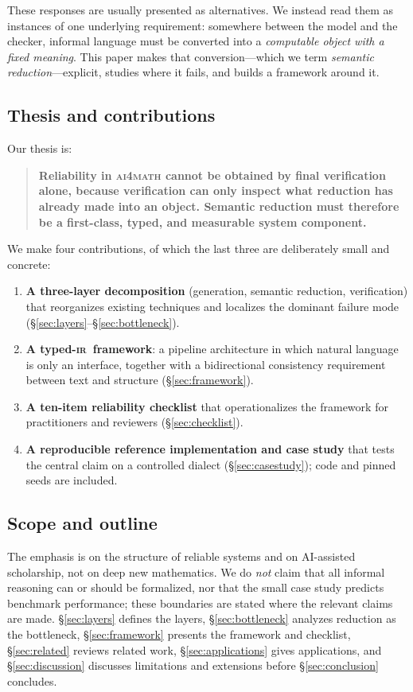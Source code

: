\documentclass[11pt,a4paper]{article}
\newcommand{\ir}{\textsc{ir}\xspace}
\theoremstyle{plain}
\theoremstyle{definition}
\theoremstyle{remark}
\begin{document}
These responses are usually presented as alternatives. We instead read
them as instances of one underlying requirement: somewhere between the
model and the checker, informal language must be converted into a
\emph{computable object with a fixed meaning}. This paper makes that
conversion---which we term \emph{semantic reduction}---explicit, studies
where it fails, and builds a framework around it.

\subsection{Thesis and contributions}
Our thesis is:
\begin{quote}
\bfseries Reliability in \textsc{ai4math} cannot be obtained by final
verification alone, because verification can only inspect what reduction
has already made into an object. Semantic reduction must therefore be a
first-class, typed, and measurable system component.
\end{quote}

We make four contributions, of which the last three are deliberately small
and concrete:
\begin{enumerate}[leftmargin=2em,itemsep=2pt]
\item \textbf{A three-layer decomposition} (generation, semantic
reduction, verification) that reorganizes existing techniques and
localizes the dominant failure mode (\S\ref{sec:layers}--\S\ref{sec:bottleneck}).
\item \textbf{A typed-\ir\ framework}: a pipeline architecture in which
natural language is only an interface, together with a bidirectional
consistency requirement between text and structure (\S\ref{sec:framework}).
\item \textbf{A ten-item reliability checklist} that operationalizes the
framework for practitioners and reviewers (\S\ref{sec:checklist}).
\item \textbf{A reproducible reference implementation and case study}
that tests the central claim on a controlled dialect
(\S\ref{sec:casestudy}); code and pinned seeds are included.
\end{enumerate}

\subsection{Scope and outline}
The emphasis is on the structure of reliable systems and on AI-assisted
scholarship, not on deep new mathematics. We do \emph{not} claim that all
informal reasoning can or should be formalized, nor that the small case
study predicts benchmark performance; these boundaries are stated where
the relevant claims are made. \S\ref{sec:layers} defines the layers,
\S\ref{sec:bottleneck} analyzes reduction as the bottleneck,
\S\ref{sec:framework} presents the framework and checklist,
\S\ref{sec:related} reviews related work, \S\ref{sec:applications} gives
applications, and \S\ref{sec:discussion} discusses limitations and
extensions before \S\ref{sec:conclusion} concludes.
\end{document}
